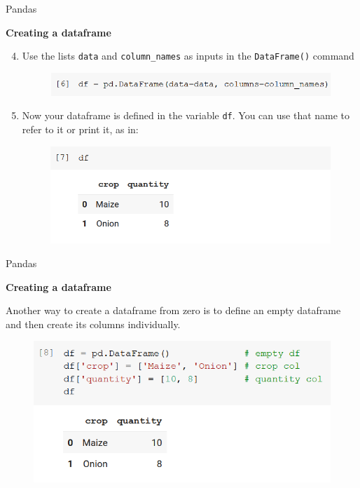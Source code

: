 \documentclass[aspectratio=169]{beamer}
\begin{document}
\begin{frame}{Pandas}

	\textbf{Creating a dataframe}

	\begin{enumerate}
		\setcounter{enumi}{3}
		\item Use the lists \texttt{data} and \texttt{column\_names} as inputs in the \texttt{DataFrame()} command
		\begin{figure}
			\includegraphics[width=0.8\linewidth]{img/dataframe_definition.png}
		\end{figure}
		\item Now your dataframe is defined in the variable \texttt{df}. You can use that name to refer to it or print it, as in:
		\begin{figure}
			\includegraphics[width=0.8\linewidth]{img/df.png}
		\end{figure}
	\end{enumerate}

\end{frame}

\begin{frame}{Pandas}

	\textbf{Creating a dataframe}

	Another way to create a dataframe from zero is to define an empty dataframe and then create its columns individually.
	\begin{figure}
		\includegraphics[width=0.8\linewidth]{img/df_definition2.png}
	\end{figure}

\end{frame}
\end{document}

